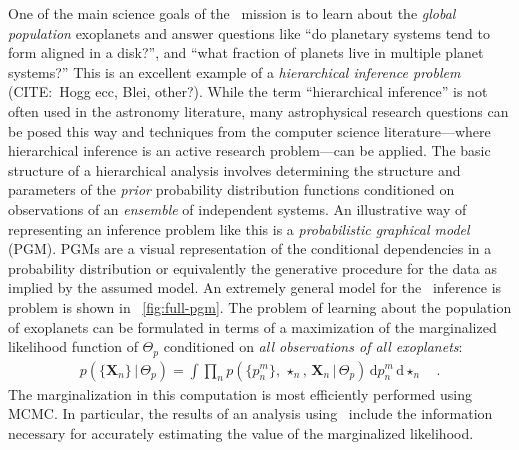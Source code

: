 \documentclass[letterpaper,12pt,preprint]{hack_aastex}
\newcommand{\Bart}{\package{Bart}}
\newcommand{\dd}{\,\mathrm{d}}
\begin{document}
One of the main science goals of the \Kepler\ mission is to learn about the
\emph{global population} exoplanets and answer questions like ``do planetary
systems tend to form aligned in a disk?'', and ``what fraction of planets live
in multiple planet systems?''
This is an excellent example of a \emph{hierarchical inference problem}
 (CITE:\ Hogg ecc, Blei, other?).
While the term ``hierarchical inference'' is not often used in the astronomy
literature, many astrophysical research questions can be posed this way and
techniques from the computer science literature---where hierarchical inference
is an active research problem---can be applied.
The basic structure of a hierarchical analysis involves determining the
structure and parameters of the \emph{prior} probability distribution
functions conditioned on observations of an \emph{ensemble} of independent
systems.
An illustrative way of representing an inference problem like this is a
\emph{probabilistic graphical model} (PGM).
PGMs are a visual representation of the conditional dependencies in a
probability distribution or equivalently the generative procedure for the data
as implied by the assumed model.
An extremely general model for the \Kepler\ inference is problem is shown in
\figurename~\ref{fig:full-pgm}.
The problem of learning about the population of exoplanets can be formulated
in terms of a maximization of the marginalized likelihood function of
$\Theta_p$ conditioned on \emph{all observations of all exoplanets}:
\begin{eqnarray}
p(\{\mathbf{X}_n\}\,|\,\Theta_p) = \int \prod_{n}
p(\{p_n^m\},\,\star_n,\,\mathbf{X}_n\,|\,\Theta_p)
\dd p_n^m \dd \star_n\quad.
\end{eqnarray}
The marginalization in this computation is most efficiently performed using
MCMC.
In particular, the results of an analysis using \Bart\ include the information
necessary for accurately estimating the value of the marginalized likelihood.
\end{document}
